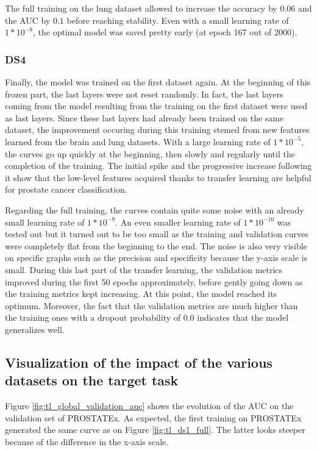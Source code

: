 The full training on the lung dataset allowed to increase the accuracy by $0.06$ and the AUC by $0.1$ before reaching stability. Even with a small learning rate of $1*10^{-8}$, the optimal model was saved pretty early (at epoch 167 out of 2000). 

\subsubsection{DS4}
\setlength{\marginparwidth}{3cm}\leavevmode {}Finally, the model was trained on the first dataset again. At the beginning of this frozen part, the last layers were not reset randomly. In fact, the last layers coming from the model resulting from the training on the first dataset were used as last layers. Since these last layers had already been trained on the same dataset, the improvement occuring during this training stemed from new features learned from the brain and lung datasets. With a large learning rate of $1*10^{-5}$, the curves go up quickly at the beginning, then slowly and regularly until the completion of the training. The initial spike and the progressive increase following it show that the low-level features acquired thanks to transfer learning are helpful for prostate cancer classification.

Regarding the full training, the curves contain quite some noise with an already small learning rate of $1*10^{-9}$. An even smaller learning rate of $1*10^{-10}$ was tested out but it turned out to be too small as the training and validation curves were completely flat from the beginning to the end. The noise is also very visible on specific graphs such as the precision and specificity because the y-axis scale is small. During this last part of the transfer learning, the validation metrics improved during the first 50 epochs approximately, before gently going down as the training metrics kept increasing. At this point, the model reached its optimum. Moreover, the fact that the validation metrics are much higher than the training ones with a dropout probability of 0.0 indicates that the model generalizes well. 


\subsection{Visualization of the impact of the various datasets on the target task}
\setlength{\marginparwidth}{3cm}\leavevmode {}Figure \ref{fig:tl_global_validation_auc} shows the evolution of the AUC on the validation set of PROSTATEx. As expected, the first training on PROSTATEx generated the same curve as on Figure \ref{fig:tl_ds1_full}. The latter looks steeper because of the difference in the x-axis scale.

